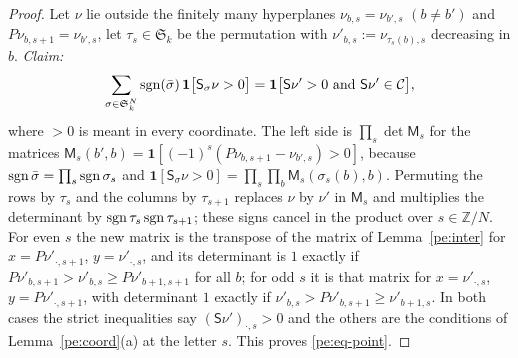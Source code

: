 \documentclass[10pt]{amsart}
\theoremstyle{definition}
\theoremstyle{remark}
\newcommand{\Z}{\mathbb Z}
\begin{document}
\begin{proof}
Let $\nu$ lie outside the finitely many hyperplanes $\nu_{b,s}=\nu_{b',s}$ $(b\ne b')$ and
$P\nu_{b,s+1}=\nu_{b',s}$, let $\tau_s\in\mathfrak S_k$ be the permutation with $\nu'_{b,s}:=
\nu_{\tau_s(b),s}$ decreasing in $b$. \emph{Claim:}
\begin{equation}\label{pe:eq-point}
\sum_{\sigma\in\mathfrak S_k^N}\operatorname{sgn}(\bar\sigma)\,\mathbf 1\bigl[\mathsf S_\sigma\nu>0\bigr]=
\mathbf 1\bigl[\mathsf S\nu'>0\ \text{and}\ \mathsf S\nu'\in\mathcal C\bigr],
\end{equation}
where $>0$ is meant in every coordinate. The left side is $\prod_s\det\mathsf M_s$ for the
matrices $\mathsf M_s(b',b)=\mathbf 1[(-1)^s(P\nu_{b,s+1}-\nu_{b',s})>0]$, because
$\operatorname{sgn}\bar\sigma=\prod_s\operatorname{sgn}\sigma_s$ and $\mathbf 1[\mathsf S_\sigma\nu>0]=\prod_s\prod_b
\mathsf M_s(\sigma_s(b),b)$. Permuting the rows by $\tau_s$ and the columns by $\tau_{s+1}$
replaces $\nu$ by $\nu'$ in $\mathsf M_s$ and multiplies the determinant by
$\operatorname{sgn}\tau_s\operatorname{sgn}\tau_{s+1}$; these signs cancel in the product over $s\in\Z/N$. For even $s$ the
new matrix is the transpose of the matrix of Lemma~\ref{pe:inter} for $x=P\nu'_{\cdot,s+1}$,
$y=\nu'_{\cdot,s}$, and its determinant is $1$ exactly if $P\nu'_{b,s+1}>\nu'_{b,s}\ge
P\nu'_{b+1,s+1}$ for all $b$; for odd $s$ it is that matrix for $x=\nu'_{\cdot,s}$,
$y=P\nu'_{\cdot,s+1}$, with determinant $1$ exactly if $\nu'_{b,s}>P\nu'_{b,s+1}\ge\nu'_{b+1,s}$.
In both cases the strict inequalities say $(\mathsf S\nu')_{\cdot,s}>0$ and the others are the
conditions of Lemma~\ref{pe:coord}(a) at the letter $s$. This proves \eqref{pe:eq-point}.


\end{proof}
\end{document}
